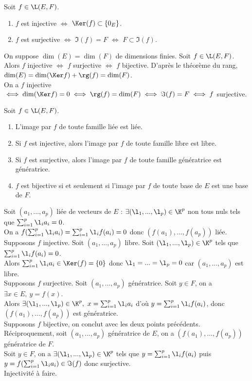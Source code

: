 \documentclass[11pt]{article}
\begin{document}
\begin{prop}{}{}
    Soit $f\in\L(E,F)$.
    \begin{enumerate}
        \item $f$ est injective $\iff$ $\Ker(f)\subset\{0_E\}$.
        \item $f$ est surjective $\iff$ $\Im(f)=F$ $\iff$ $F\subset\Im(f)$.
    \end{enumerate}
\end{prop}

\begin{thm}{}{}
    On suppose $\dim(E)=\dim(F)$ de dimensions finies. Soit $f\in\L(E,F)$.\\
    Alors $f$ injective $\iff$ $f$ surjective $\iff$ $f$ bijective.
    \tcblower
    D'après le théorème du rang, $\dim(E)=\dim(\Ker f)+\rg(f)=\dim(F)$.\\
    On a $f$ injective $\iff \dim(\Ker f) = 0 \iff \rg(f)=\dim(F) \iff \Im(f)=F \iff f$ surjective.
\end{thm}

\begin{prop}{}{}
    Soit $f\in\L(E,F)$.
    \begin{enumerate}
        \item L'image par $f$ de toute famille liée est liée.
        \item Si $f$ est injective, alors l'image par $f$ de toute famille libre est libre.
        \item Si $f$ est surjective, alors l'image par $f$ de toute famille génératrice est génératrice.
        \item $f$ est bijective si et seulement si l'image par $f$ de toute base de $E$ est une base de $F$.
    \end{enumerate}
    \tcblower
     Soit $(a_1,...,a_p)$ liée de vecteurs de $E$ : $\exists(\l_1,...,\l_p)\in\K^p$ non tous nuls tels que $\sum_{i=1}^p\l_ia_i=0$.\\
    On a $f(\sum_{i=1}^p\l_ia_i)=\sum_{i=1}^p\l_if(a_i)=0$ donc $(f(a_1),...,f(a_p))$ liée.\\
     Supposons $f$ injective. Soit $(a_1,...,a_p)$ libre. Soit $(\l_1,...,\l_p)\in\K^p$ tels que $\sum_{i=1}^p\l_if(a_i)=0$.\\
    Alors $\sum_{i=1}^p\l_ia_i\in\Ker(f)=\{0\}$ donc $\l_1=...=\l_p=0$ car $(a_1,...,a_p)$ est libre.\\
     Supposons $f$ surjective. Soit $(a_1,...,a_p)$ génératrice. Soit $y\in F$, on a $\exists x \in E, ~ y=f(x)$.\\
    Alors $\exists(\l_1,...,\l_p)\in\K^p, ~ x=\sum_{i=1}^p\l_ia_i$ d'où $y=\sum_{i=1}^p\l_if(a_i)$, donc $(f(a_1),...,f(a_p))$ est génératrice.\\
     Supposons $f$ bijective, on conclut avec les deux points précédents.\\
    Réciproquement, soit $(a_1,...,a_p)$ génératrice de $E$, on a $(f(a_1),...,f(a_p))$ génératrice de $F$.\\
    Soit $y\in F$, on a $\exists (\l_1,...,\l_p)\in\K^p$ tels que $y=\sum_{i=1}^p\l_if(a_i)$ puis $y=f(\sum_{i=1}^p\l_ia_i)\in\Im(f)$ donc surjective.\\
    Injectivité à faire.
\end{prop}
\end{document}
